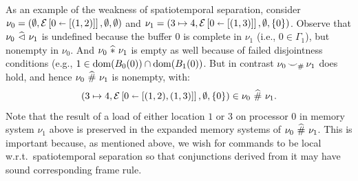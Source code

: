 \documentclass[11pt]{report}
\begin{document}
As an example of the weakness of spatiotemporal separation, consider $\nu_0 = (\operatorname{\emptyset},\mathcal{E} \left[ 0 \shortleftarrow \left[(1,2)\right] \right],\operatorname{\emptyset},\operatorname{\emptyset})$ and $\nu_1 = (3 \mapsto 4,\mathcal{E} \left[ 0 \shortleftarrow \left[(1,3)\right] \right],\operatorname{\emptyset},\left\lbrace 0 \right\rbrace)$. Observe that $\nu_0 \operatorname{\,\widehat{\vartriangleleft}\,} \nu_1$ is undefined because the buffer 0 is complete in $\nu_1$ (i.e., $0 \in \Gamma_1$), but nonempty in $\nu_0$. And $\nu_0 \operatorname{\,\widehat{\ast}\,} \nu_1$ is empty as well because of failed disjointness conditions (e.g., $1 \in \operatorname{\mathrm{dom}}(B_0(0)) \cap \operatorname{\mathrm{dom}}(B_1(0))$. But in contrast $\nu_0 \operatorname{\smile}_\# \nu_1$ does hold, and hence $\nu_0 \operatorname{\,\widehat{\#}\,} \nu_1$ is nonempty, with: \[ (3 \mapsto 4,\mathcal{E} \left[ 0 \shortleftarrow \left[(1,2),(1,3)\right] \right],\operatorname{\emptyset},\left\lbrace 0 \right\rbrace) \in \nu_0 \operatorname{\,\widehat{\#}\,} \nu_1.\] Note that the result of a load of either location $1$ or $3$ on processor 0 in memory system $\nu_1$ above is preserved in the expanded memory systems of $\nu_0 \operatorname{\,\widehat{\#}\,} \nu_1$. This is important because, as mentioned above, we wish for commands to be local w.r.t.\ spatiotemporal separation so that conjunctions derived from it may have sound corresponding frame rule. 
\end{document}
